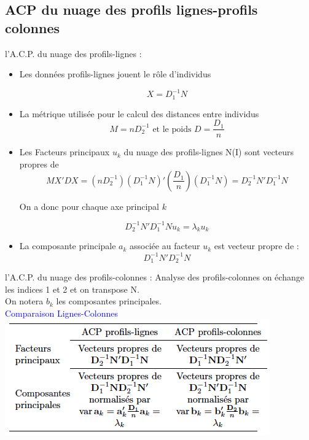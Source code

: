 \documentclass[10pt]{beamer}
\begin{document}
\subsection{ACP du nuage des profils lignes-profils colonnes }
\begin{frame}{l’A.C.P. du nuage des profils-lignes :}
\begin{itemize}

\item Les données profils-lignes jouent le rôle d'individus 

$$ X= D_1^{-1}N$$

\item La métrique utilisée pour le calcul des distances entre
individus  $$ M=nD_2^{-1} \text{ et le poids } D= \frac{D_1}{n}$$

\item Les Facteurs principaux $u_k$ du nuage des profils-lignes N(I) sont vecteurs propres de $$MX'DX=(nD_2^{-1}) (D_1^{-1}N)'(\frac{D_1}{n})(D_1^{-1}N)=D_2^{-1}N'D_1^{-1}N$$ 

On a donc pour chaque axe principal $k$

 $$D_2^{-1}N'D_1^{-1}Nu_k=\lambda_ku_k$$

\item La composante principale $a_k$  associée au facteur $u_k$ est  vecteur propre de  :  $$D_1^{-1}N'D_2^{-1}N$$
\end{itemize}
\end{frame}

\begin{frame}{l’A.C.P. du nuage des profils-colonnes :}
Analyse des profils-colonnes on échange les indices 1 et 2
et on transpose N. \\

On notera $b_k$ les composantes principales. \\ 
\centering 
\textcolor{blue}{Comparaison Lignes-Colonnes}
\includegraphics[scale=.7]{Synthese.png} 

\end{frame}
\end{document}
